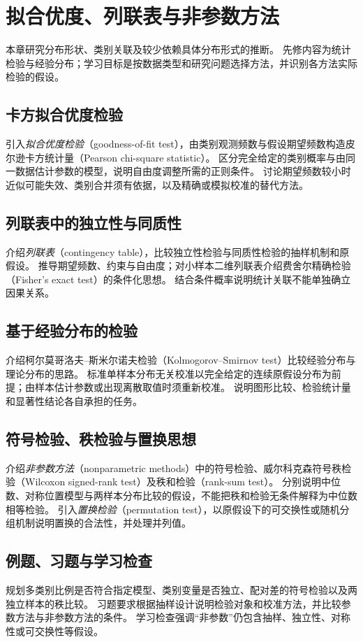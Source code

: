 \setcounter{chapter}{14} %
\chapter{拟合优度、列联表与非参数方法}
\label{chap:ps-nonparametric}

本章研究分布形状、类别关联及较少依赖具体分布形式的推断。
先修内容为统计检验与经验分布；学习目标是按数据类型和研究问题选择方法，并识别各方法实际检验的假设。

\section{卡方拟合优度检验}
\label{sec:ps-goodness-fit}
引入\emph{拟合优度检验}（goodness-of-fit test），由类别观测频数与假设期望频数构造皮尔逊卡方统计量（Pearson chi-square statistic）。
区分完全给定的类别概率与由同一数据估计参数的模型，说明自由度调整所需的正则条件。
讨论期望频数较小时近似可能失效、类别合并须有依据，以及精确或模拟校准的替代方法。

\section{列联表中的独立性与同质性}
\label{sec:ps-contingency}
介绍\emph{列联表}（contingency table），比较独立性检验与同质性检验的抽样机制和原假设。
推导期望频数、约束与自由度；对小样本二维列联表介绍费舍尔精确检验（Fisher's exact test）的条件化思想。
结合条件概率说明统计关联不能单独确立因果关系。

\section{基于经验分布的检验}
\label{sec:ps-empirical-tests}
介绍柯尔莫哥洛夫--斯米尔诺夫检验（Kolmogorov--Smirnov test）比较经验分布与理论分布的思路。
标准单样本分布无关校准以完全给定的连续原假设分布为前提；由样本估计参数或出现离散取值时须重新校准。
说明图形比较、检验统计量和显著性结论各自承担的任务。

\section{符号检验、秩检验与置换思想}
\label{sec:ps-rank-tests}
介绍\emph{非参数方法}（nonparametric methods）中的符号检验、威尔科克森符号秩检验（Wilcoxon signed-rank test）及秩和检验（rank-sum test）。
分别说明中位数、对称位置模型与两样本分布比较的假设，不能把秩和检验无条件解释为中位数相等检验。
引入\emph{置换检验}（permutation test），以原假设下的可交换性或随机分组机制说明置换的合法性，并处理并列值。

\section{例题、习题与学习检查}
规划多类别比例是否符合指定模型、类别变量是否独立、配对差的符号检验以及两独立样本的秩比较。
习题要求根据抽样设计说明检验对象和校准方法，并比较参数方法与非参数方法的条件。
学习检查强调“非参数”仍包含抽样、独立性、对称性或可交换性等假设。





